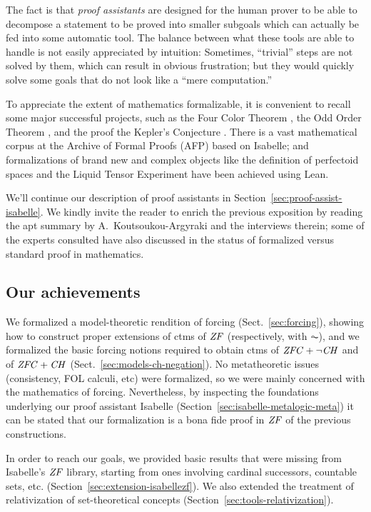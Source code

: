The fact is that \emph{proof assistants} are designed for the human prover to
be able to decompose a statement to be proved into smaller subgoals
which can actually be fed into some automatic tool. The balance between
what these tools are able to handle is not  easily appreciated by
intuition: Sometimes, ``trivial'' steps are not solved by them, which
can result in obvious frustration; but they would quickly solve some
goals that do not look like a ``mere computation.''

To appreciate the extent of mathematics formalizable, it is convenient to recall
some major successful projects, such as the Four Color Theorem
\cite{MR2463991}, the Odd Order Theorem
\cite{10.1007/978-3-642-39634-2_14}, and the proof the Kepler's
Conjecture \cite{MR3659768}. There is a vast mathematical corpus at
the Archive of Formal Proofs (AFP) based on Isabelle; and formalizations of
brand new and complex objects like the definition of perfectoid spaces \cite{10.1145/3372885.3373830}
and the Liquid Tensor Experiment \cite{LTE2020,LTE2021} have been
achieved using Lean.

We'll continue our description of proof assistants in
Section~\ref{sec:proof-assist-isabelle}. We kindly invite the reader
to enrich the previous exposition by reading the apt summary by
A.~Koutsoukou-Argyraki \cite{angeliki} and the interviews
therein; some of the experts consulted have also discussed
in \cite{2022arXiv220704779B} the status of formalized versus standard
proof in mathematics.

\subsection{Our achievements}
We formalized a model-theoretic rendition of forcing (Sect.~\ref{sec:forcing}), showing how to
construct proper extensions of ctms of $\mathit{ZF}$ (respectively, with
$\AC$), and we formalized the basic forcing notions required to obtain
ctms of $\mathit{ZFC} + \neg\mathit{CH}$ and of $\mathit{ZFC} + \mathit{CH}$ (Sect.~\ref{sec:models-ch-negation}). No metatheoretic issues
(consistency, FOL calculi, etc) were formalized, so we were mainly
concerned with the mathematics of forcing. Nevertheless, by inspecting
the foundations underlying our proof assistant Isabelle
(Section~\ref{sec:isabelle-metalogic-meta}) it can be stated that our
formalization is a bona fide proof in $\mathit{ZF}$ of the previous
constructions.

In order to reach our goals, we provided basic results that were
missing from Isabelle's $\mathit{ZF}$ library, starting from ones
involving cardinal successors, countable sets, etc.
(Section~\ref{sec:extension-isabellezf}). We also extended the treatment of relativization of
set-theoretical concepts (Section~\ref{sec:tools-relativization}).

